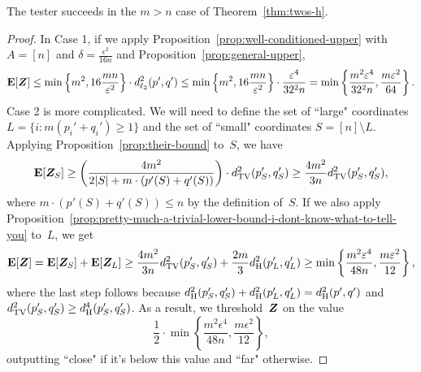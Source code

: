 \begin{lemma}
The tester succeeds in the $m > n$ case of Theorem~\ref{thm:twos-h}.
\end{lemma}
\begin{proof}
In Case 1, if we apply Proposition~\ref{prop:well-conditioned-upper} with $A = [n]$ and $\delta = \frac{\epsilon^2}{16n}$
and Proposition~\ref{prop:general-upper},
\begin{equation*}
\mbox{\bf E}[\boldsymbol{Z}]
\leq \min\left\{m^2, 16\frac{mn}{\varepsilon^2}\right\} \cdot d_{\ell_2}^2(p',q')
\leq \min\left\{m^2, 16\frac{mn}{\varepsilon^2}\right\} \cdot \frac{\varepsilon^4}{32^2 n}
= \min\left\{\frac{m^2\varepsilon^4}{32^2 n}, \frac{m\varepsilon^2}{64}\right\}.
\end{equation*}
Case 2 is more complicated.
We will need to define the set of ``large" coordinates
$L = \{i : m (p_i' + q_i') \geq 1\}$
and the set of ``small" coordinates $S = [n] \setminus L$.
Applying Proposition~\ref{prop:their-bound} to~$S$, we have
\begin{equation*}
\mbox{\bf E}[\boldsymbol{Z}_S] \geq \left(\frac{4m^2}{2|S| + m\cdot(p'(S) + q'(S))}\right)\cdot d_{\mathrm {TV}}^2(p_S',q_S')
\geq \frac{4m^2}{3n} d_{\mathrm {TV}}^2(p_S',q_S'),
\end{equation*}
where $m\cdot(p'(S)+q'(S)) \leq n$ by the definition of~$S$.
If we also apply Proposition~\ref{prop:pretty-much-a-trivial-lower-bound-i-dont-know-what-to-tell-you} to~$L$,
we get
\begin{equation*}
\mbox{\bf E}[\boldsymbol{Z}] = \mbox{\bf E}[\boldsymbol{Z}_S] + \mbox{\bf E}[\boldsymbol{Z}_L]
\geq \frac{4m^2}{3n} d_{\mathrm {TV}}^2(p_S',q_S') + \frac{2m}{3} d_{\mathrm {H}}^2(p_L',q_L')
\geq \min\left\{\frac{m^2\varepsilon^4}{48n}, \frac{m\varepsilon^2}{12}\right\},
\end{equation*}
where the last step follows
because $d_{\mathrm {H}}^2(p_S',q_S') + d_{\mathrm {H}}^2(p_L',q_L') = d_{\mathrm {H}}^2(p',q')$ and $d_{\mathrm {TV}}^2(p_S',q_S') \geq d_{\mathrm {H}}^4(p_S',q_S')$.
As a result, we threshold~$\boldsymbol{Z}$ on the value
\begin{equation*}
\frac{1}{2} \cdot \min\left\{\frac{m^2\epsilon^4}{48n}, \frac{m\epsilon^2}{12}\right\},
\end{equation*}
outputting ``close" if it's below this value and ``far" otherwise.


\end{proof}
